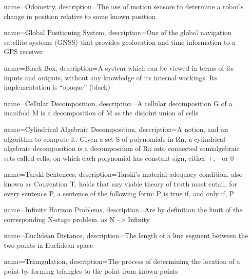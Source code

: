 {
    name=Odometry,
    description={The use of motion sensors to determine a robot's change in position relative to some known position \cite{robo-rats_locomotion_odometry}}
}

{
    name=Global Positioning System,
    description={One of the global navigation satellite systems (GNSS) that provides geolocation and time information to a GPS receiver \cite{global_positioning_system}}
}

{
    name=Black Box,
    description={A system which can be viewed in terms of its inputs and outputs, without any knowledge of its internal workings. Its implementation is ``opaque'' (black) \cite{a_general_black_box_theory}}
}

{
    name=Cellular Decomposition,
    description={A cellular decomposition G of a manifold M is a decomposition of M as the disjoint union of cells \cite{decompositions_of_manifolds}}
}

{
    name=Cylindrical Algebraic Decomposition,
    description={A notion, and an algorithm to compute it. Given a set S of polynomials in Rn, a cylindrical algebraic decomposition is a decomposition of Rn into connected semialgebraic sets called cells, on which each polynomial has constant sign, either +, - or 0 \cite{cylindrical_algebraic_decompostion}}
}

{
    name=Tarski Sentences,
    description={Tarski's material adequacy condition, also known as Convention T, holds that any viable theory of truth must entail, for every sentence P, a sentence of the following form: P is true if, and only if, P \cite{a_companion_to_the_philosophy_of_language}}
}

{
    name=Infinite Horizon Problems,
    description={Are by definition the limit of the corresponding N-stage problem, as N --> Infinity \cite{infinite_horizon_problems}}
}

{
    name=Euclidean Distance,
    description={The length of a line segment between the two points in Euclidean space \cite{precalculus_a_problems_oriented_approach}}
}

{
    name=Triangulation,
    description={The process of determining the location of a point by forming triangles to the point from known points \cite{multiple_view_geometry_in_computer_vision}}
}

